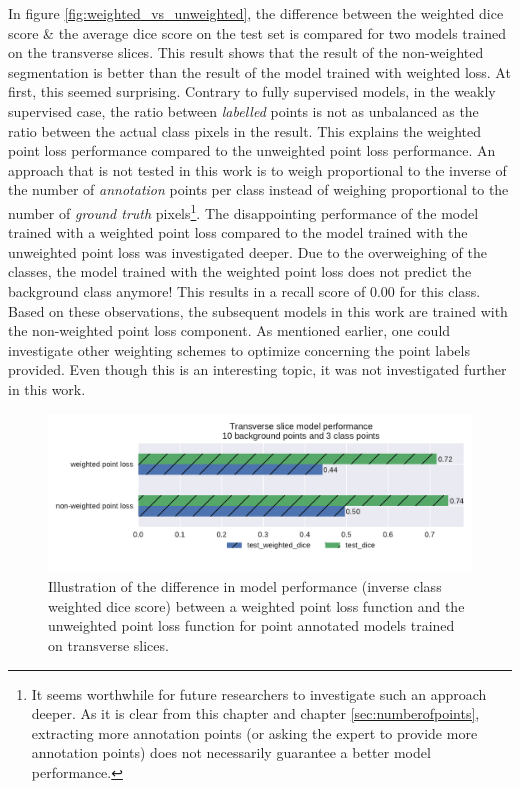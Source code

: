 \par{
    In figure \ref{fig:weighted_vs_unweighted}, the difference between the weighted dice score \& the average dice score on the test set is compared for two models trained on the transverse slices.
    This result shows that the result of the non-weighted segmentation is better than the result of the model trained with weighted loss.
    At first, this seemed surprising.
    Contrary to fully supervised models, in the weakly supervised case, the ratio between \textit{labelled} points is not as unbalanced as the ratio between the actual class pixels in the result.
    This explains the weighted point loss performance compared to the unweighted point loss performance.
    An approach that is not tested in this work is to weigh proportional to the inverse of the number of \textit{annotation} points per class instead of weighing proportional to the number of \textit{ground truth} pixels\footnote{
        It seems worthwhile for future researchers to investigate such an approach deeper. 
        As it is clear from this chapter and chapter \ref{sec:numberofpoints}, extracting more annotation points (or asking the expert to provide more annotation points) does not necessarily guarantee a better model performance.
    }.
    The disappointing performance of the model trained with a weighted point loss compared to the model trained with the unweighted point loss was  investigated deeper.
    Due to the overweighing of the classes, the model trained with the weighted point loss does not predict the background class anymore! 
    This results in a recall score of 0.00 for this class.
    Based on these observations, the subsequent models in this work are trained with the non-weighted point loss component.
    As mentioned earlier, one could investigate other weighting schemes to optimize concerning the point labels provided.
    Even though this is an interesting topic, it was not investigated further in this work.
}
\begin{figure}
    \centering
    \includegraphics[width=.95\textwidth]{images/weightedvsnonweighted_transverse.pdf}
    \caption{
        Illustration of the difference in model performance (inverse class weighted dice score) between a weighted point loss function and the unweighted point loss function for point annotated models trained on transverse slices.
    \label{fig:weighted_vs_unweighted_transverse}}
\end{figure}%
